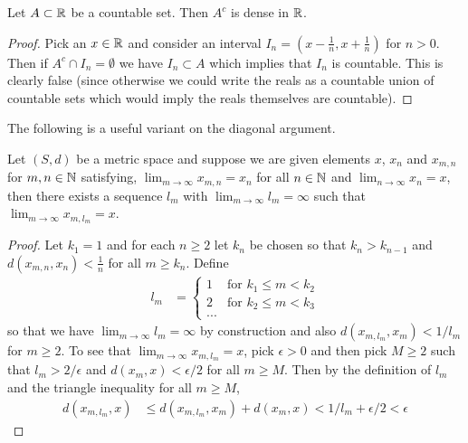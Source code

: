 \begin{lem}\label{ComplementOfCountableSetDense}Let $A \subset \mathbb{R}$ be a countable set.  Then $A^c$ is
  dense in $\mathbb{R}$.
\end{lem}
\begin{proof}
Pick an $x \in \mathbb{R}$ and consider an interval $I_n = (x - \frac{1}{n}, x +
\frac{1}{n})$ for $n > 0$.  Then if $A^c \cap I_n = \emptyset$ we have
$I_n \subset A$ which implies that $I_n$ is countable.  This is
clearly false (since otherwise we could write the reals as a countable
union of countable sets which would imply the reals themselves are countable).
\end{proof}

The following is a useful variant on the diagonal argument.
\begin{prop}\label{ArrayPathArgumentMetricSpace}Let $(S,d)$ be a metric space and suppose we are given
  elements $x$, $x_n$ and $x_{m,n}$ for $m,n \in \mathbb{N}$
  satisfying, $\lim_{m \to \infty} x_{m,n} = x_n$ for all $n \in \mathbb{N}$ and $\lim_{n \to \infty} x_n = x$, then
there exists a sequence $l_m$ with $\lim_{m \to \infty} l_m = \infty$ such that $\lim_{m \to \infty} x_{m, l_m} = x$.
\end{prop}
\begin{proof}
Let $k_1 = 1$ and for each $n \geq 2$ let $k_n$ be chosen so that $k_n > k_{n-1}$ and $d(x_{m,n}, x_n) < \frac{1}{n}$ for all $m \geq k_n$.  Define
\begin{align*}
l_m &= \begin{cases}
1 & \text{for $k_1 \leq m < k_2$} \\
2 & \text{for $k_2 \leq m < k_3$} \\
...
\end{cases}
\end{align*}
so that we have $\lim_{m \to \infty} l_m = \infty$ by construction and also $d(x_{m, l_m}, x_m) < 1/l_m$ for $m \geq 2$.
To see that $\lim_{m \to \infty} x_{m, l_m} = x$, pick $\epsilon > 0$ and then pick $M \geq 2$ such that $l_m > 2/\epsilon$ and $d(x_m, x) < \epsilon/2$ for all $m \geq M$.  Then
by the definition of $l_m$ and the triangle inequality for all $m \geq M$,
\begin{align*}
d(x_{m, l_m}, x) &\leq d(x_{m, l_m}, x_m) + d(x_m, x) < 1/l_m + \epsilon/2 < \epsilon
\end{align*}
\end{proof}

